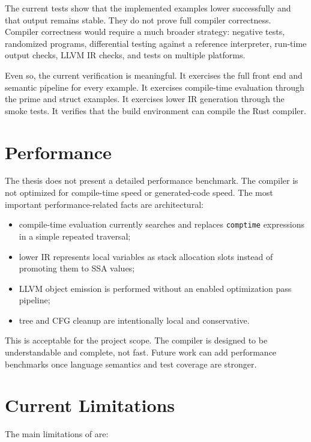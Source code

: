 The current tests show that the implemented examples lower successfully and
that \irtree{} output remains stable. They do not prove full compiler
correctness. Compiler correctness would require a much broader strategy:
negative tests, randomized programs, differential testing against a reference
interpreter, run-time output checks, LLVM IR checks, and tests on multiple
platforms.

Even so, the current verification is meaningful. It exercises the full front end
and semantic pipeline for every example. It exercises compile-time evaluation
through the prime and struct examples. It exercises lower IR generation through
the smoke tests. It verifies that the build environment can compile the Rust
compiler.

\section{Performance}

The thesis does not present a detailed performance benchmark. The compiler is
not optimized for compile-time speed or generated-code speed. The most important
performance-related facts are architectural:

\begin{itemize}
  \item compile-time evaluation currently searches and replaces \texttt{comptime}
        expressions in a simple repeated traversal;
  \item lower IR represents local variables as stack allocation slots instead of
        promoting them to SSA values;
  \item LLVM object emission is performed without an enabled optimization pass
        pipeline;
  \item tree and CFG cleanup are intentionally local and conservative.
\end{itemize}

This is acceptable for the project scope. The compiler is designed to be
understandable and complete, not fast. Future work can add performance
benchmarks once language semantics and test coverage are stronger.

\section{Current Limitations}

The main limitations of \epl{} are:

